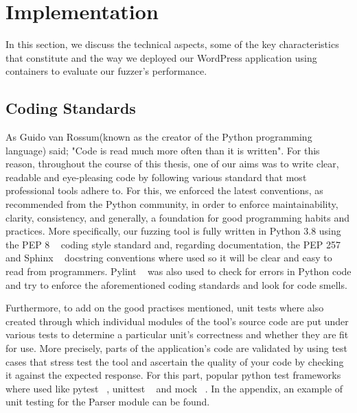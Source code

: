 \chapter{Implementation}
\label{sec:implementation}
\minitoc
\vspace*{1cm}

In this section, we discuss the technical aspects, some of
the key characteristics that constitute \pname{} and the way
we deployed our WordPress application using containers to
evaluate our fuzzer's performance.

\section{Coding Standards}
As Guido van Rossum(known as the creator of the Python programming language) said; "Code is read much more often than it is written". For this reason, throughout the course of this thesis, one of our aims was to write clear, readable and eye-pleasing code by following various standard that most professional tools adhere to. For this, we enforced the latest conventions, as recommended from the Python community, in order to enforce maintainability, clarity, consistency, and generally, a foundation for good programming habits and practices. More specifically, our fuzzing tool is fully written in Python 3.8 using the PEP 8 ~\cite{python_pep8} coding style standard and, regarding documentation, the PEP 257 ~\cite{python_pep257} and Sphinx ~\cite{sphinx} docstring conventions where used so it will be clear and easy to read from programmers. Pylint ~\cite{pylint_module} was also used to check for errors in Python code and try to enforce the aforementioned coding standards and look for code smells.

Furthermore, to add on the good practises mentioned, unit tests where also created through which individual modules of the tool's source code are put under various tests to determine a particular unit's correctness and whether they are fit for use. More precisely, parts of the application's code are validated by using test cases that stress test the tool and ascertain the quality of your code by checking it against the expected response. For this part, popular python test frameworks where used like pytest ~\cite{pytest_module}, unittest ~\cite{unittest_module} and mock ~\cite{mock}. In the appendix, an example of unit testing for the Parser module can be found.

